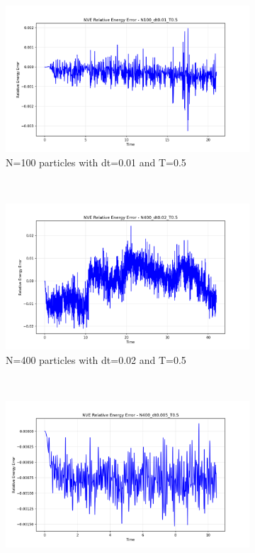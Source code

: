 \begin{figure}[H]
	\centering
	\begin{subfigure}{0.45\textwidth}
		\includegraphics[width=\textwidth]{media/error_N100_dt0.01_T0.5.png}
		\caption{N=100 particles with dt=0.01 and T=0.5}
		\label{sfig:error_N100}
	\end{subfigure}%
	~
	\begin{subfigure}{0.45\textwidth}
		\includegraphics[width=\textwidth]{media/error_N400_dt0.02_T0.5.png}
		\caption{N=400 particles with dt=0.02 and T=0.5}
		\label{sfig:error_N400_dt002}
	\end{subfigure}%
	\\
	\begin{subfigure}{0.45\textwidth}
		\includegraphics[width=\textwidth]{media/error_N400_dt0.005_T0.5.png}

\end{subfigure}
\end{figure}
